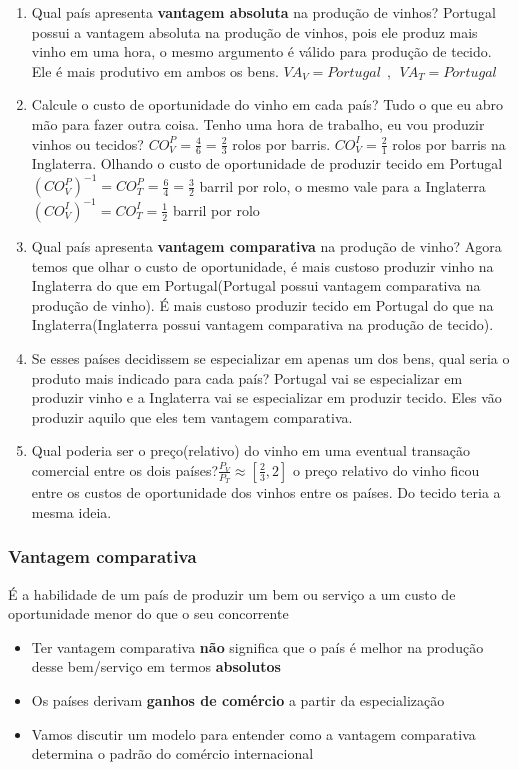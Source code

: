 \documentclass[a4paper,12pt]{article}[abntex2]
\begin{document}
\begin{enumerate}
    \item Qual país apresenta \textbf{vantagem absoluta} na produção de vinhos? Portugal possui a vantagem absoluta na produção de vinhos, pois ele produz mais vinho em uma hora, o mesmo argumento é válido para produção de tecido. Ele é mais produtivo em ambos os bens. \(VA_V=Portugal \ \ , \ \ VA_T=Portugal\)
    \item Calcule o custo de oportunidade do vinho em cada país? Tudo o que eu abro mão para fazer outra coisa. Tenho uma hora de trabalho, eu vou produzir vinhos ou tecidos? \(CO_V^P=\frac{4}{6}=\frac{2}{3}\) rolos por barris. \(CO_V^I=\frac{2}{1}\) rolos por barris na Inglaterra. Olhando o custo de oportunidade de produzir tecido em Portugal \((CO_V^P)^{-1}=CO_T^P=\frac{6}{4}=\frac{3}{2}\) barril por rolo, o mesmo vale para a Inglaterra \((CO_V^I)^{-1}=CO_T^I=\frac{1}{2}\) barril por rolo
    \item Qual país apresenta \textbf{vantagem comparativa} na produção de vinho? Agora temos que olhar o custo de oportunidade, é mais custoso produzir vinho na Inglaterra do que em Portugal(Portugal possui vantagem comparativa na produção de vinho). É mais custoso produzir tecido em Portugal do que na Inglaterra(Inglaterra possui vantagem comparativa na produção de tecido).
    \item Se esses países decidissem se especializar em apenas um dos bens, qual seria o produto mais indicado para cada país? Portugal vai se especializar em produzir vinho e a Inglaterra vai se especializar em produzir tecido. Eles vão produzir aquilo que eles tem vantagem comparativa. 
    \item Qual poderia ser o preço(relativo) do vinho em uma eventual transação comercial entre os dois países?\(\frac{P_V}{P_T}\approx[\frac{2}{3},2]\) o preço relativo do vinho ficou entre os custos de oportunidade dos vinhos entre os países. Do tecido teria a mesma ideia.
\end{enumerate}

\subsubsection{\textbf{Vantagem comparativa}}
É a habilidade de um país de produzir um bem ou serviço a um custo de oportunidade menor do que o seu concorrente\begin{itemize}
    \item Ter vantagem comparativa \textbf{não} significa que o país é melhor na produção desse bem/serviço em termos \textbf{absolutos}
    \item Os países derivam \textbf{ganhos de comércio} a partir da especialização
    \item Vamos discutir um modelo para entender como a vantagem comparativa determina o padrão do comércio internacional
\end{itemize}
\end{document}
